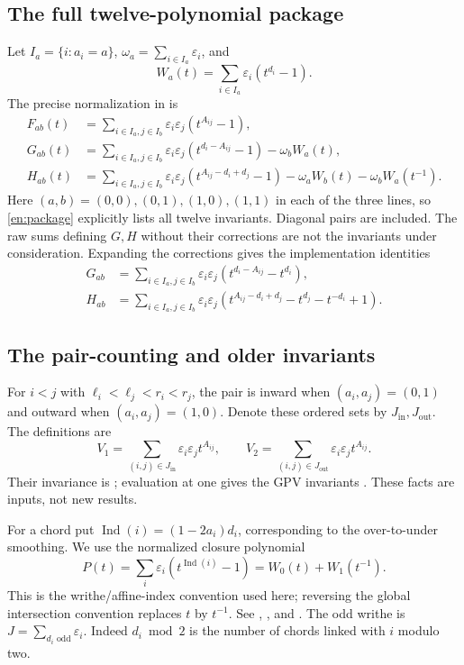\documentclass[12pt]{amsart}
\theoremstyle{definition}
\theoremstyle{remark}
\numberwithin{equation}{section}
\newcommand{\Jin}{J_{\mathrm{in}}}
\newcommand{\Jout}{J_{\mathrm{out}}}
\newcommand{\eps}{\varepsilon}
\begin{document}
\subsection{The full twelve-polynomial package}
Let $I_a=\{i:a_i=a\}$, $\omega_a=\sum_{i\in I_a}\eps_i$, and
\[
W_a(t)=\sum_{i\in I_a}\eps_i(t^{d_i}-1).
\]
The precise normalization in \cite[Theorem 2.3]{NNSW1} is
\begin{align}
F_{ab}(t)&=\sum_{i\in I_a,j\in I_b}\eps_i\eps_j(t^{A_{ij}}-1),\label{en:F}\\
G_{ab}(t)&=\sum_{i\in I_a,j\in I_b}\eps_i\eps_j(t^{d_i-A_{ij}}-1)
-\omega_bW_a(t),\label{en:G}\\
H_{ab}(t)&=\sum_{i\in I_a,j\in I_b}\eps_i\eps_j(t^{A_{ij}-d_i+d_j}-1)
-\omega_aW_b(t)-\omega_bW_a(t^{-1}).\label{en:H}
\end{align}
Here $(a,b)=(0,0),(0,1),(1,0),(1,1)$ in each of the three lines,
so \eqref{en:package} explicitly lists all twelve invariants. Diagonal
pairs are included. The raw sums defining $G,H$ without their corrections
are not the invariants under consideration.
Expanding the corrections gives the implementation identities
\begin{align}
G_{ab}&=\sum_{i\in I_a,j\in I_b}\eps_i\eps_j
 (t^{d_i-A_{ij}}-t^{d_i}),\label{en:Gfast}\\
H_{ab}&=\sum_{i\in I_a,j\in I_b}\eps_i\eps_j
 (t^{A_{ij}-d_i+d_j}-t^{d_j}-t^{-d_i}+1).\label{en:Hfast}
\end{align}

\subsection{The pair-counting and older invariants}
For $i<j$ with $\ell_i<\ell_j<r_i<r_j$, the pair is inward when
$(a_i,a_j)=(0,1)$ and outward when $(a_i,a_j)=(1,0)$. Denote these ordered
sets by $\Jin,\Jout$. The definitions are
\begin{equation}\label{en:V}
V_1=\sum_{(i,j)\in\Jin}\eps_i\eps_jt^{A_{ij}},\qquad
V_2=\sum_{(i,j)\in\Jout}\eps_i\eps_jt^{A_{ij}}.
\end{equation}
Their invariance is \cite[Theorem 3.1]{SW}; evaluation at one gives the
GPV invariants \cite[\S3.2]{GPV}. These facts are inputs, not new results.

For a chord put $\operatorname{Ind}(i)=(1-2a_i)d_i$, corresponding to
the over-to-under smoothing. We use the normalized closure polynomial
\begin{equation}\label{en:P}
P(t)=\sum_i\eps_i(t^{\operatorname{Ind}(i)}-1)
=W_0(t)+W_1(t^{-1}).
\end{equation}
This is the writhe/affine-index convention used here; reversing the global
intersection convention replaces $t$ by $t^{-1}$. See
\cite[\S2.2]{Cheng}, \cite[\S3]{Affine}, and
\cite[Proposition 10.1]{NNSW1}. The odd writhe is
$J=\sum_{d_i\text{ odd}}\eps_i$. Indeed $d_i\bmod2$ is the number of
chords linked with $i$ modulo two.
\end{document}
